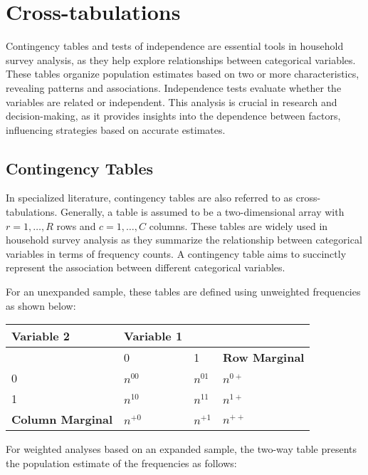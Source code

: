 \documentclass[
  12pt,
]{book}
\begin{document}
\hypertarget{cross-tabulations}{%
\section{Cross-tabulations}\label{cross-tabulations}}

Contingency tables and tests of independence are essential tools in household survey analysis, as they help explore relationships between categorical variables. These tables organize population estimates based on two or more characteristics, revealing patterns and associations. Independence tests evaluate whether the variables are related or independent. This analysis is crucial in research and decision-making, as it provides insights into the dependence between factors, influencing strategies based on accurate estimates.

\hypertarget{contingency-tables}{%
\subsection{Contingency Tables}\label{contingency-tables}}

In specialized literature, contingency tables are also referred to as cross-tabulations. Generally, a table is assumed to be a two-dimensional array with \(r=1,\ldots,R\) rows and \(c=1,\ldots,C\) columns. These tables are widely used in household survey analysis as they summarize the relationship between categorical variables in terms of frequency counts. A contingency table aims to succinctly represent the association between different categorical variables.

For an unexpanded sample, these tables are defined using unweighted frequencies as shown below:

\begin{longtable}[]{@{}llll@{}}
\toprule\noalign{}
\textbf{Variable 2} & \textbf{Variable 1} & & \\
\midrule\noalign{}
\endhead
\bottomrule\noalign{}
\endlastfoot
& 0 & 1 & \textbf{Row Marginal} \\
0 & \(n^{00}\) & \(n^{01}\) & \(n^{0+}\) \\
1 & \(n^{10}\) & \(n^{11}\) & \(n^{1+}\) \\
\textbf{Column Marginal} & \(n^{+0}\) & \(n^{+1}\) & \(n^{++}\) \\
\end{longtable}

For weighted analyses based on an expanded sample, the two-way table presents the population estimate of the frequencies as follows:
\end{document}
